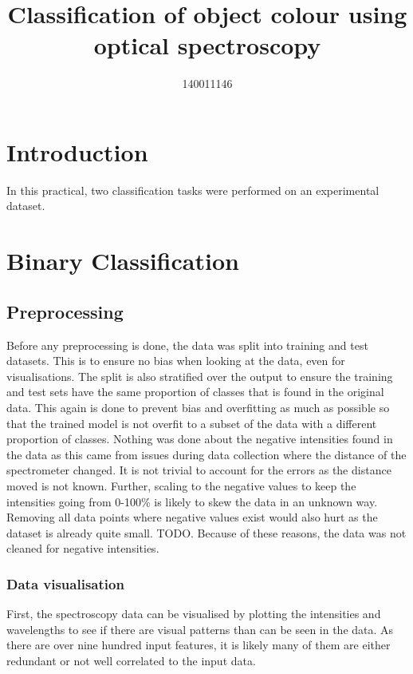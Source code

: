\documentclass{article}
\title{Classification of object colour using optical spectroscopy}
\author{140011146}
\begin{document}



\section{Introduction}

In this practical, two classification tasks were performed on an experimental dataset. 

\section{Binary Classification}

\subsection{Preprocessing}
Before any preprocessing is done, the data was split into training and test datasets. This is to ensure no bias when looking at the data, even for visualisations. The split is also stratified over the output to ensure the training and test sets have the same proportion of classes that is found in the original data. This again is done to prevent bias and overfitting as much as possible so that the trained model is not overfit to a subset of the data with a different proportion of classes. 
\n
Nothing was done about the negative intensities found in the data as this came from issues during data collection where the distance of the spectrometer changed. It is not trivial to account for the errors as the distance moved is not known. Further, scaling to the negative values to keep the intensities going from 0-100\% is likely to skew the data in an unknown way. Removing all data points where negative values exist would also hurt as the dataset is already quite small. TODO. Because of these reasons, the data was not cleaned for negative intensities. 


\subsubsection{Data visualisation}
First, the spectroscopy data can be visualised by plotting the intensities and wavelengths to see if there are visual patterns than can be seen in the data. As there are over nine hundred input features, it is likely many of them are either redundant or not well correlated to the input data. 
\end{document}
